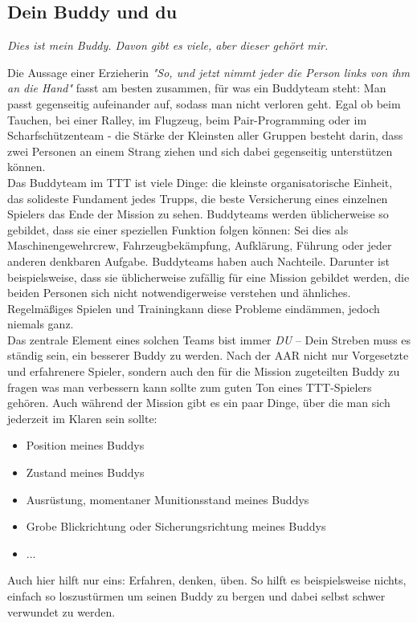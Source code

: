 \subsection{Dein Buddy und du}
\centerline{\textit{Dies ist mein Buddy. Davon gibt es viele, aber dieser gehört mir.}}
Die Aussage einer Erzieherin \textit{"So, und jetzt nimmt jeder die Person links von ihm an die Hand"} fasst am besten zusammen, für was ein Buddyteam steht: Man passt gegenseitig aufeinander auf, sodass man nicht verloren geht. Egal ob beim Tauchen, bei einer Ralley, im Flugzeug, beim Pair-Programming oder im Scharfschützenteam - die Stärke der Kleinsten aller Gruppen besteht darin, dass zwei Personen an einem Strang ziehen und sich dabei gegenseitig unterstützen können.
\\Das Buddyteam im TTT ist viele Dinge: die kleinste organisatorische Einheit, das solideste Fundament jedes Trupps, die beste Versicherung eines einzelnen Spielers das Ende der Mission zu sehen. Buddyteams werden üblicherweise so gebildet, dass sie einer speziellen Funktion folgen können: Sei dies als Maschinengewehrcrew, Fahrzeugbekämpfung, Aufklärung, Führung oder jeder anderen denkbaren Aufgabe. Buddyteams haben auch Nachteile. Darunter ist beispielsweise, dass sie üblicherweise zufällig für eine Mission gebildet werden, die beiden Personen sich nicht notwendigerweise verstehen und ähnliches. Regelmäßiges Spielen und Trainingkann diese Probleme eindämmen, jedoch niemals ganz.
\\Das zentrale Element eines solchen Teams bist immer \textit{DU} -- Dein Streben muss es ständig sein, ein besserer Buddy zu werden. Nach der AAR nicht nur Vorgesetzte und erfahrenere Spieler, sondern auch den für die Mission zugeteilten Buddy zu fragen was man verbessern kann sollte zum guten Ton eines TTT-Spielers gehören. Auch während der Mission gibt es ein paar Dinge, über die man sich jederzeit im Klaren sein sollte:
\begin{itemize}
	\item Position meines Buddys
	\item Zustand meines Buddys
	\item Ausrüstung, momentaner Munitionsstand meines Buddys
	\item Grobe Blickrichtung oder Sicherungsrichtung meines Buddys
	\item ...
\end{itemize}
Auch hier hilft nur eins: Erfahren, denken, üben. So hilft es beispielsweise nichts, einfach so loszustürmen um seinen Buddy zu bergen und dabei selbst schwer verwundet zu werden. 

